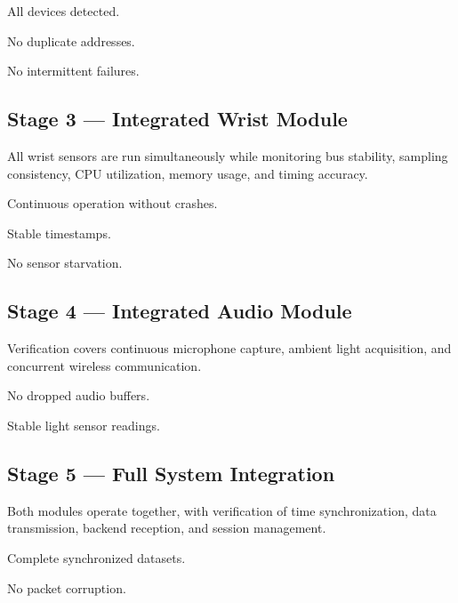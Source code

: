 \begin{checklist}
    \item All devices detected.
    \item No duplicate addresses.
    \item No intermittent failures.
\end{checklist}

\subsection{Stage 3 --- Integrated Wrist Module}
\label{sec:stage3-wrist-integration}

All wrist sensors are run simultaneously while monitoring bus stability, sampling consistency, CPU utilization, memory usage, and timing accuracy.

\begin{checklist}
    \item Continuous operation without crashes.
    \item Stable timestamps.
    \item No sensor starvation.
\end{checklist}

\subsection{Stage 4 --- Integrated Audio Module}
\label{sec:stage4-audio-integration}

Verification covers continuous microphone capture, ambient light acquisition, and concurrent wireless communication.

\begin{checklist}
    \item No dropped audio buffers.
    \item Stable light sensor readings.
\end{checklist}

\subsection{Stage 5 --- Full System Integration}
\label{sec:stage5-full-integration}

Both modules operate together, with verification of time synchronization, data transmission, backend reception, and session management.

\begin{checklist}
    \item Complete synchronized datasets.
    \item No packet corruption.
\end{checklist}

